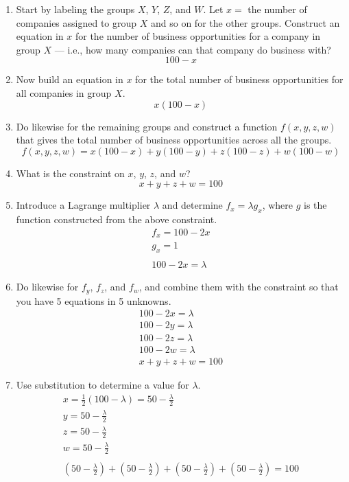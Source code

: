 \documentclass[letterpaper,12pt,fleqn]{article}
\renewcommand{\l}{\lambda}
\begin{document}
\begin{enumerate}[label={\alph*)}]
\item Start by labeling the groups \(X\), \(Y\), \(Z\), and \(W\).  Let \(x=\) the number of companies assigned to group \(X\)
  and so on for the other groups.  Construct an equation in \(x\) for the number of business opportunities for a company in
  group \(X\) --- i.e., how many companies can that company do business with?
  \[100-x\]
\item Now build an equation in \(x\) for the total number of business opportunities for all companies in group \(X\).
  \[x(100-x)\]
\item Do likewise for the remaining groups and construct a function \(f(x,y,z,w)\) that gives the total number of business
  opportunities across all the groups.
  \[f(x,y,z,w)=x(100-x)+y(100-y)+z(100-z)+w(100-w)\]
\item What is the constraint on \(x\), \(y\), \(z\), and \(w\)?
  \[x+y+z+w=100\]
\item Introduce a Lagrange multiplier \(\l\) and determine \(f_x=\l g_x\), where \(g\) is the function constructed from the
  above constraint.
  \begin{gather*}
    f_x=100-2x \\
    g_x=1 \\
    \\
    100-2x=\l
  \end{gather*}
\item Do likewise for \(f_y\), \(f_z\), and \(f_w\), and combine them with the constraint so that you have 5 equations in
  5 unknowns.
  \begin{gather*}
    100-2x=\l \\
    100-2y=\l \\
    100-2z=\l \\
    100-2w=\l \\
    x+y+z+w=100
  \end{gather*}    
\item Use substitution to determine a value for \(\l\).
  \begin{gather*}
    x=\frac{1}{2}(100-\l)=50-\frac{\l}{2} \\
    y=50-\frac{\l}{2} \\
    z=50-\frac{\l}{2} \\
    w=50-\frac{\l}{2} \\
    \\
    (50-\frac{\l}{2})+(50-\frac{\l}{2})+(50-\frac{\l}{2})+(50-\frac{\l}{2})=100 \\

\end{gather*}
\end{enumerate}
\end{document}
